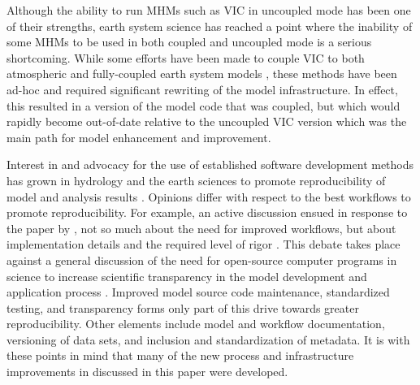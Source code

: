 \documentclass[gmd, manuscript]{copernicus}
\begin{document}
  Although the ability to run MHMs such as VIC in uncoupled mode has been one of their strengths, earth system science has reached a point where the inability of some MHMs to be used in both coupled and uncoupled mode is a serious shortcoming. While some efforts have been made to couple VIC to both atmospheric and fully-coupled earth system models \citep[e.g.][]{Zhu_2009,Hamman_2016a}, these methods have been ad-hoc and required significant rewriting of the model infrastructure. In effect, this resulted in a version of the model code that was coupled, but which would rapidly become out-of-date relative to the uncoupled VIC version which was the main path for model enhancement and improvement.

  Interest in and advocacy for the use of established software development methods has grown in hydrology and the earth sciences to promote reproducibility of model and analysis results \citep[e.g.][]{Wilson_2014,Ceola_2015,Fienen_2016,Gil_2016,Hutton_2016}. Opinions differ with respect to the best workflows to promote reproducibility. For example, an active discussion ensued in response to the paper by \citet{Hutton_2016}, not so much about the need for improved workflows, but about implementation details and the required level of rigor \citep{Anel_2017,Melsen_2017,Hut_2017,Hutton_2017a,Hutton_2017b}. This debate takes place against a general discussion of the need for open-source computer programs in science to increase scientific transparency in the model development and application process \citep{Ince_2012}. Improved model source code maintenance, standardized testing, and transparency forms only part of this drive towards greater reproducibility. Other elements include model and workflow documentation, versioning of data sets, and inclusion and standardization of metadata. It is with these points in mind that many of the new process and infrastructure improvements in discussed in this paper were developed.
\end{document}
